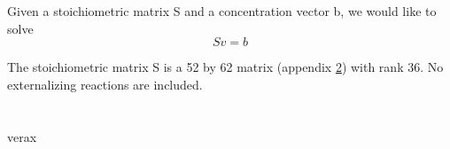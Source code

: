 \documentclass{article}
\begin{document}
\section{}
Given a stoichiometric matrix S and a concentration vector b, we would like to solve
\begin{equation}
Sv = b
\end{equation}

The stoichiometric matrix S is a 52 by 62 matrix (appendix \ref{fullsm}) with rank 36.
No externalizing reactions are included.

\appendix
\section{}
\label{fullsm}
verax 
\end{document}
